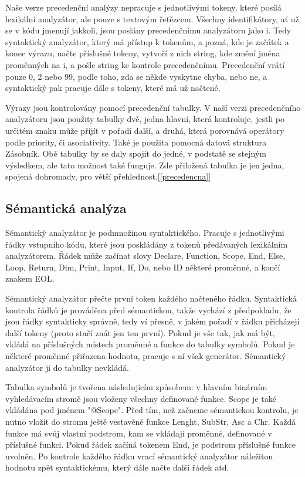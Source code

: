 \documentclass[11pt, a4paper]{article}
\begin{document}
Naše verze precedenční analýzy nepracuje s jednotlivými tokeny, které posílá lexikální analyzátor, ale pouze s textovým řetězcem. Všechny identifikátory, ať už se v kódu jmenují jakkoli, jsou poslány precedenčnímu analyzátoru jako i. Tedy syntaktický analyzátor, který má přístup k tokenům, a pozná, kde je začátek a konec výrazu, načte příslušné tokeny, vytvoří z nich string, kde změní jména proměnných na i, a pošle string ke kontrole precedenčnímu. Precedenční vrátí pouze 0, 2 nebo 99, podle toho, zda se někde vyskytne chyba, nebo ne, a syntaktický pak pracuje dále s tokeny, které má už načtené.

Výrazy jsou kontrolovány pomocí precedenční tabulky. V naší verzi precedenčního analyzátoru jsou použity tabulky dvě, jedna hlavní, která kontroluje, jestli po určitém znaku může přijít v pořadí další, a druhá, která porovnává operátory podle priority, či asociativity. Také je použita pomocná datová struktura Zásobník. Obě tabulky by se daly spojit do jedné, v podstatě se stejným výsledkem, ale tato možnost také funguje. Zde přiložená tabulka je jen jedna, spojená dohromady, pro větší přehlednost.[\ref{precedencna}]






		

\subsection{Sémantická analýza}

Sémantický analyzátor je podmnožinou syntaktického. Pracuje s jednotlivými řádky vstupního kódu, které jsou poskládány z tokenů předávaných lexikálním analyzátorem. Řádek může začínat slovy Declare, Function, Scope, End, Else, Loop, Return, Dim, Print, Input, If, Do, nebo ID některé proměnné, a končí znakem EOL.

Sémantický analyzátor přečte první token každého načteného řádku. Syntaktická kontrola řádků je prováděna před sémantickou, takže vychází z předpokladu, že jsou řádky syntakticky správně, tedy ví přesně, v jakém pořadí v řádku přicházejí další tokeny (proto stačí znát jen ten první). Pokud je vše tak, jak má být, vkládá na příslušných místech proměnné a funkce do tabulky symbolů. Pokud je některé proměnné přiřazena hodnota, pracuje s ní však generátor. Sémantický analyzátor ji do tabulky nevkládá.

Tabulka symbolů je tvořena následujícím způsobem: v hlavním binárním vyhledávacím stromě jsou vloženy všechny definované funkce. Scope je také vkládána pod jménem "@Scope". Před tím, než začneme sémantickou kontrolu, je nutno vložit do stromu ještě vestavěné funkce Lenght, SubStr, Asc a Chr. Každá funkce má svůj vlastní podstrom, kam se vkládají proměnné, definované v příslušné funkci. Pokud řádek začíná tokenem End, je podstrom příslušné funkce uvolněn. Po kontrole každého řádku vrací sémantický analyzátor náležitou hodnotu zpět syntaktickému, který dále načte další řádek atd.
\end{document}
